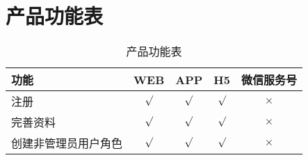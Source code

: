 
\section{产品功能表} %
\label{sec:function_table}
\begin{table}[htbp]
\caption{产品功能表}
\label{tab:function}
\begin{tabular*}{\textwidth}{lcccc}
	\toprule  %
	功能      &WEB        &APP       &H5        &微信服务号 \\
	\midrule  %
	注册      &$\surd$    &$\surd$   &$\surd$   &$\times$  \\
	完善资料   &$\surd$    &$\surd$   &$\surd$   &$\times$  \\
	创建非管理员用户角色 &$\surd$ &$\surd$ &$\surd$ &$\times$ \\
	\bottomrule
\end{tabular*}
\end{table}

